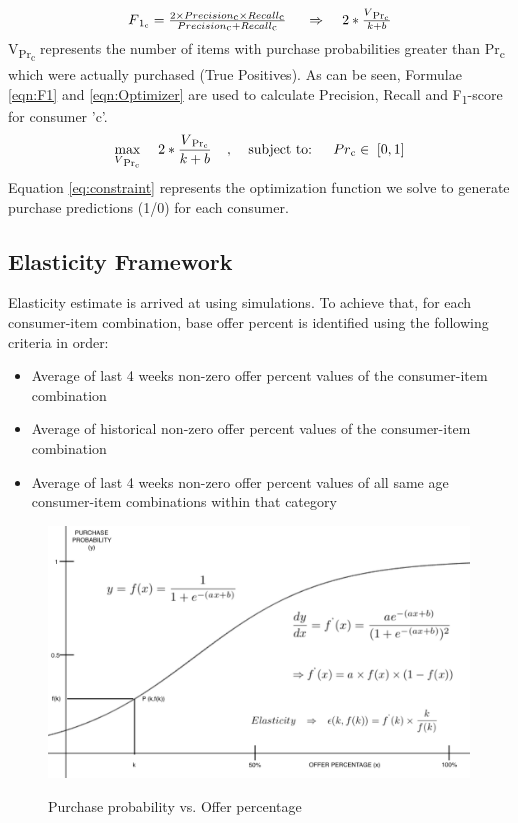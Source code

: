   \begin{equation}
    \begin{array}{l}
      F\textsubscript{1\textsubscript{c}} = \frac{2 \times Precision\textsubscript{c} 
      \times Recall\textsubscript{c}} 
      {Precision\textsubscript{c} + Recall\textsubscript{c}}
      \;
      \;\;\;\;\Rightarrow	\;\;\;\;
      2 * 
      \frac{
        V\textsubscript{Pr\textsubscript{c}}
      }
      {
        k + b
      }
    \end{array}
    \label{eqn:Optimizer}
  \end{equation}
V\textsubscript{Pr\textsubscript{c}} represents the number of items with purchase 
probabilities greater than Pr\textsubscript{c} which were actually purchased (True Positives). 
As can be seen, Formulae \ref{eqn:F1} and \ref{eqn:Optimizer} are used to calculate Precision, Recall and 
F\textsubscript{1}-score for consumer 'c'. 
  \begin{equation}
    \max_{V\textsubscript{Pr\textsubscript{c}}} \;\;\;\; 2 * \frac{ V\textsubscript{Pr\textsubscript{c}}}{k + b}
    \;\;\;\;,\;\;\;\;  \text{subject to: } \;\;\;\;  Pr\textsubscript{c}  \in \; [0,1]
    \label{eq:constraint}
  \end{equation}
Equation \ref{eq:constraint} represents the optimization function we solve to generate purchase predictions (1/0) for each consumer.

\subsection{Elasticity Framework}
Elasticity estimate is arrived at using simulations. To achieve that, for each consumer-item combination, base 
offer percent is identified using the following criteria in order:
\begin{itemize}
\item Average of last 4 weeks non-zero offer percent values of the consumer-item combination
\item Average of historical non-zero offer percent values of the consumer-item combination
\item Average of last 4 weeks non-zero offer percent values of all same age consumer-item combinations within that category
\end{itemize}

  \begin{figure}[t]
    \centering 
    \caption{Purchase probability vs. Offer percentage} 
    \includegraphics[width=4.4in]{img/elasticity.png} 
    \label{fig:elasticity} 
  \end{figure}
 
